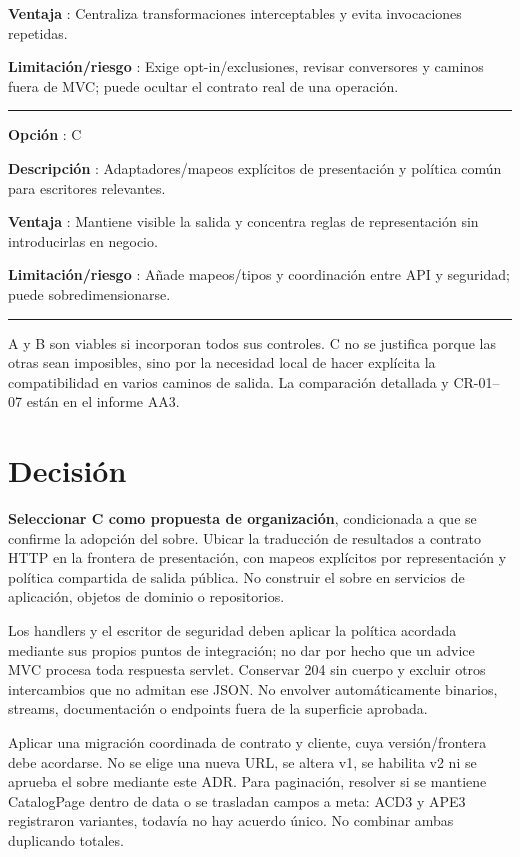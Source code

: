 \documentclass[12pt,a4paper]{report}
\begin{document}
\textbf{Ventaja }: Centraliza transformaciones interceptables y evita
invocaciones repetidas.

\textbf{Limitación/riesgo }: Exige opt-in/exclusiones, revisar
conversores y caminos fuera de MVC; puede ocultar el contrato real de
una operación.

\medskip\hrule\medskip

\textbf{Opción }: C

\textbf{Descripción }: Adaptadores/mapeos explícitos de presentación y
política común para escritores relevantes.

\textbf{Ventaja }: Mantiene visible la salida y concentra reglas de
representación sin introducirlas en negocio.

\textbf{Limitación/riesgo }: Añade mapeos/tipos y coordinación entre API
y seguridad; puede sobredimensionarse.

\medskip\hrule\medskip

A y B son viables si incorporan todos sus controles. C no se justifica
porque las otras sean imposibles, sino por la necesidad local de hacer
explícita la compatibilidad en varios caminos de salida. La comparación
detallada y CR-01--07 están en el informe AA3.

\section{Decisión}\label{adr-decisiuxf3n}

\textbf{Seleccionar C como propuesta de organización}, condicionada a
que se confirme la adopción del sobre. Ubicar la traducción de
resultados a contrato HTTP en la frontera de presentación, con mapeos
explícitos por representación y política compartida de salida pública.
No construir el sobre en servicios de aplicación, objetos de dominio o
repositorios.

Los handlers y el escritor de seguridad deben aplicar la política
acordada mediante sus propios puntos de integración; no dar por hecho
que un advice MVC procesa toda respuesta servlet. Conservar 204 sin
cuerpo y excluir otros intercambios que no admitan ese JSON. No envolver
automáticamente binarios, streams, documentación o endpoints fuera de la
superficie aprobada.

Aplicar una migración coordinada de contrato y cliente, cuya
versión/frontera debe acordarse. No se elige una nueva URL, se altera
v1, se habilita v2 ni se aprueba el sobre mediante este ADR. Para
paginación, resolver si se mantiene CatalogPage dentro de data o se
trasladan campos a meta: ACD3 y APE3 registraron variantes, todavía no
hay acuerdo único. No combinar ambas duplicando totales.
\end{document}
